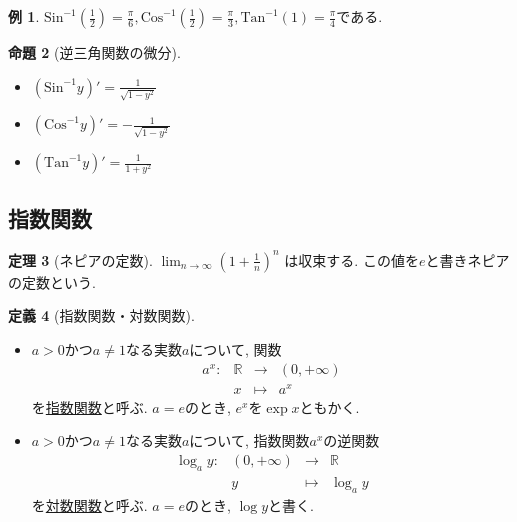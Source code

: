 \documentclass[dvipdfmx,a4paper,11pt]{article}
\newcommand{\R}{\mathbb{R}}
\newcommand{\Sin}{\text{Sin}^{-1}}
\newcommand{\Cos}{\text{Cos}^{-1}}
\newcommand{\Tan}{\text{Tan}^{-1}}
\theoremstyle{definition}
\newtheorem{thm}{定理}
\newtheorem{prop}[thm]{命題}
\newtheorem{dfn}[thm]{定義}
\newtheorem{exa}[thm]{例}
\begin{document}
\begin{exa}
$\Sin(\frac{1}{2})=\frac{\pi}{6}, \Cos(\frac{1}{2})=\frac{\pi}{3},\Tan(1)=\frac{\pi}{4}$である.
\end{exa}

 \begin{tcolorbox}[
    colback = white,
    colframe = green!35!black,
    fonttitle = \bfseries,
    breakable = true]
    \begin{prop}[逆三角関数の微分]
    \text{}
 \begin{itemize}
 \item  $(\Sin y)' =  \frac{1}{\sqrt{1-y^2}}$ 
 \item  $(\Cos y)' = - \frac{1}{\sqrt{1-y^2}}$
  \item  $(\Tan y)' = \frac{1}{1 + y^2}$
 \end{itemize}
 \end{prop}
   \end{tcolorbox}
   
 \subsection{指数関数}
 
 \begin{tcolorbox}[
    colback = white,
    colframe = green!35!black,
    fonttitle = \bfseries,
    breakable = true]
    \begin{thm}[ネピアの定数]
$
\lim_{n \rightarrow \infty} \left(1 + \frac{1}{n}\right)^n
$
は収束する. この値を$e$と書きネピアの定数という.
\end{thm}
  \end{tcolorbox} 
  
 \begin{tcolorbox}[
    colback = white,
    colframe = green!35!black,
    fonttitle = \bfseries,
    breakable = true]
    \begin{dfn}[指数関数・対数関数]
    \text{}
 \begin{itemize}
\item $a>0$かつ$a \neq 1$なる実数$a$について, 関数
$$
\begin{array}{cccc}
a^x: &\R& \rightarrow & (0, + \infty)  \\
&x& \longmapsto & a^x
\end{array}
$$
を\underline{指数関数}と呼ぶ.
$a=e$のとき, $e^x$を$\exp x$ともかく.
\item $a>0$かつ$a \neq 1$なる実数$a$について, 指数関数$a^x$の逆関数
$$
\begin{array}{cccc}
\log_{a} y: &(0, + \infty) & \rightarrow & \R \\
&y& \longmapsto & \log_{a} y
\end{array}
$$
を\underline{対数関数}と呼ぶ.
$a=e$のとき, $\log y$と書く.
 \end{itemize}
 \end{dfn}
   \end{tcolorbox}
   
\end{document}
